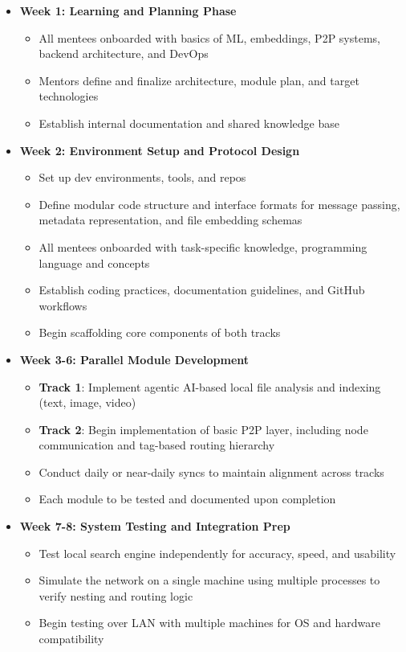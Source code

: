 \documentclass[11pt,a4paper]{article}
\begin{document}
\begin{itemize}
    \item \textbf{Week 1: Learning and Planning Phase}
    \begin{itemize}
        \item All mentees onboarded with basics of ML, embeddings, P2P systems, backend architecture, and DevOps
        \item Mentors define and finalize architecture, module plan, and target technologies
        \item Establish internal documentation and shared knowledge base
    \end{itemize}

    \item \textbf{Week 2: Environment Setup and Protocol Design}
    \begin{itemize}
        \item Set up dev environments, tools, and repos
        \item Define modular code structure and interface formats for message passing, metadata representation, and file embedding schemas
        \item All mentees onboarded with task-specific knowledge, programming language and concepts
        \item Establish coding practices, documentation guidelines, and GitHub workflows
        \item Begin scaffolding core components of both tracks
    \end{itemize}

    \item \textbf{Week 3-6: Parallel Module Development}
    \begin{itemize}
        \item \textbf{Track 1}: Implement agentic AI-based local file analysis and indexing (text, image, video)
        \item \textbf{Track 2}: Begin implementation of basic P2P layer, including node communication and tag-based routing hierarchy
        \item Conduct daily or near-daily syncs to maintain alignment across tracks
        \item Each module to be tested and documented upon completion
    \end{itemize}

    \item \textbf{Week 7-8: System Testing and Integration Prep}
    \begin{itemize}
        \item Test local search engine independently for accuracy, speed, and usability
        \item Simulate the network on a single machine using multiple processes to verify nesting and routing logic
        \item Begin testing over LAN with multiple machines for OS and hardware compatibility
    \end{itemize}


\end{itemize}
\end{document}
